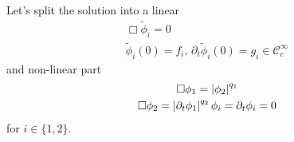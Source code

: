 \documentclass[11pt, oneside]{amsart}
\begin{document}
	Let's split the solution into a linear
	\begin{equation*}
		\begin{gathered}
			\Box\tilde{\phi}_i=0\\
			\tilde{\phi}_i(0)=f_i,\,\partial_t\tilde{\phi}_i(0)=g_i\in\mathcal{C}^\infty_c
		\end{gathered}
	\end{equation*}
	and non-linear part
	\begin{equation*}
		\begin{gathered}
			\Box\phi_1=\left\lvert \phi_2\right\rvert^{q_1}\\
			\Box\phi_2=\left\lvert \partial_t\phi_1\right\rvert^{q_2}
			\phi_i=\partial_t\phi_i=0
		\end{gathered}
	\end{equation*}		
	for $i\in\{1,2\}$.
	
\end{document}
